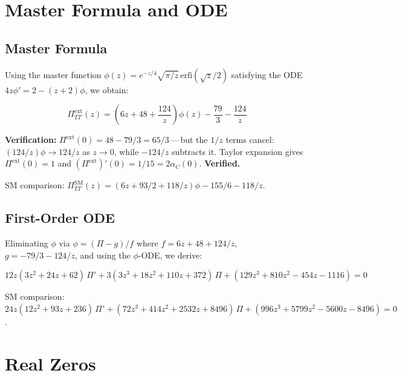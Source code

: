 \documentclass[11pt,a4paper]{article}
\newcommand{\proven}[1]{\textcolor{verified}{\textbf{#1}}}
\begin{document}
\section{Master Formula and ODE}

\subsection{Master Formula}

Using the master function $\phi(z) = e^{-z/4}\sqrt{\pi/z}\,\mathrm{erfi}(\sqrt{z}/2)$
satisfying the ODE $4z\phi' = 2 - (z+2)\phi$, we obtain:

\begin{equation}\label{eq:Pi_ext}
  \boxed{
    \Pi_{TT}^{\mathrm{ext}}(z) = \left(6z + 48 + \frac{124}{z}\right)\phi(z)
    - \frac{79}{3} - \frac{124}{z}
  }
\end{equation}

\noindent\textbf{Verification:} $\Pi^{\mathrm{ext}}(0) = 48 - 79/3 = 65/3$\,---\,but the $1/z$ terms cancel:
$(124/z)\phi \to 124/z$ as $z\to 0$, while $-124/z$ subtracts it. Taylor expansion gives
$\Pi^{\mathrm{ext}}(0) = 1$ and $(\Pi^{\mathrm{ext}})'(0) = 1/15 = 2\alpha_C(0)$. \proven{Verified.}

\medskip\noindent
SM comparison: $\Pi_{TT}^{\mathrm{SM}}(z) = (6z + 93/2 + 118/z)\phi - 155/6 - 118/z$.

\subsection{First-Order ODE}

Eliminating $\phi$ via $\phi = (\Pi - g)/f$ where $f = 6z + 48 + 124/z$, $g = -79/3 - 124/z$,
and using the $\phi$-ODE, we derive:

\begin{equation}\label{eq:ODE_ext}
  \boxed{
    12z(3z^2 + 24z + 62)\,\Pi' + 3(3z^3 + 18z^2 + 110z + 372)\,\Pi
    + (129z^3 + 810z^2 - 454z - 1116) = 0
  }
\end{equation}

\noindent SM comparison: $24z(12z^2+93z+236)\,\Pi' + (72z^3+414z^2+2532z+8496)\,\Pi
+ (996z^3+5799z^2-5600z-8496) = 0$.


\section{Real Zeros}
\end{document}
